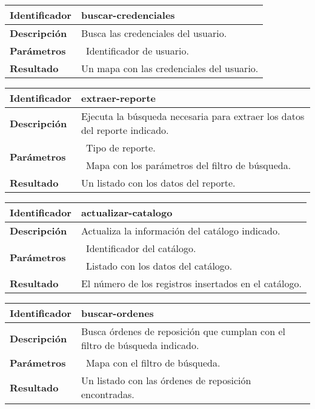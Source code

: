 	\begin{longtable}{|p{}|p{}|}
		\hline
		\textbf{Identificador}	& \textbf{buscar-credenciales}\\
		\hline
		\hline
		\textbf{Descripción}	& Busca las credenciales del usuario.\\
		\hline
		\textbf{Parámetros}		& \textbullet\, Identificador de usuario.\\
		\hline
		\textbf{Resultado}		& Un mapa con las credenciales del usuario.\\
		\hline
	\end{longtable}

	\begin{longtable}{|p{}|p{}|}
		\hline
		\textbf{Identificador}	& \textbf{extraer-reporte}\\
		\hline
		\hline
		\textbf{Descripción}	& Ejecuta la búsqueda necesaria para extraer los datos del reporte indicado.\\
		\hline
		\multirow{2}{*}{\textbf{Parámetros}}	& \textbullet\, Tipo de reporte.\\
												& \textbullet\, Mapa con los parámetros del filtro de búsqueda.\\
		\hline
		\textbf{Resultado}		& Un listado con los datos del reporte.\\
		\hline
	\end{longtable}

	\begin{longtable}{|p{}|p{}|}
		\hline
		\textbf{Identificador}	& \textbf{actualizar-catalogo}\\
		\hline
		\hline
		\textbf{Descripción}	& Actualiza la información del catálogo indicado.\\
		\hline
		\multirow{2}{*}{\textbf{Parámetros}}	& \textbullet\, Identificador del catálogo.\\
												& \textbullet\, Listado con los datos del catálogo.\\
		\hline
		\textbf{Resultado}		& El número de los registros insertados en el catálogo.\\
		\hline
	\end{longtable}

	\begin{longtable}{|p{}|p{}|}
		\hline
		\textbf{Identificador}	& \textbf{buscar-ordenes}\\
		\hline
		\hline
		\textbf{Descripción}	& Busca órdenes de reposición que cumplan con el filtro de búsqueda indicado.\\
		\hline
		\textbf{Parámetros}		& \textbullet\, Mapa con el filtro de búsqueda.\\
		\hline
		\textbf{Resultado}		& Un listado con las órdenes de reposición encontradas.\\
		\hline
	\end{longtable}

